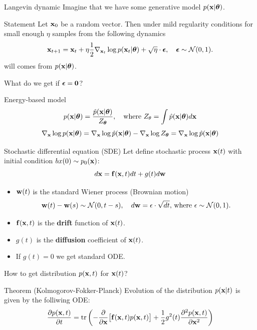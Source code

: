 \begin{frame}{Langevin dynamic}
	Imagine that we have some generative model $p(\mathbf{x} | \boldsymbol{\theta})$.
	\begin{block}{Statement}
		Let $\mathbf{x}_0$ be a random vector. Then under mild regularity conditions for small enough $\eta$ samples from the following dynamics
		\[
			\mathbf{x}_{t + 1} = \mathbf{x}_t + \eta \frac{1}{2} \nabla_{\mathbf{x}_t} \log p(\mathbf{x}_t | \boldsymbol{\theta}) + \sqrt{\eta} \cdot \boldsymbol{\epsilon}, \quad \boldsymbol{\epsilon} \sim \mathcal{N}(0, 1).
		\]
		will comes from $p(\mathbf{x} | \boldsymbol{\theta})$.
	\end{block}
	What do we get if $\boldsymbol{\epsilon} = \boldsymbol{0}$?
	\begin{block}{Energy-based model}
		\[
			p(\mathbf{x} | \boldsymbol{\theta}) = \frac{\hat{p}(\mathbf{x} | \boldsymbol{\theta})}{Z_{\boldsymbol{\theta}}}, \quad \text{where } Z_{\theta} = \int \hat{p}(\mathbf{x} | \boldsymbol{\theta}) d \mathbf{x}
		\]
		\[
			\nabla_{\mathbf{x}} \log p(\mathbf{x} | \boldsymbol{\theta}) = \nabla_{\mathbf{x}} \log \hat{p}(\mathbf{x} | \boldsymbol{\theta}) - \nabla_{\mathbf{x}} \log Z_{\boldsymbol{\theta}} = \nabla_{\mathbf{x}} \log \hat{p}(\mathbf{x} | \boldsymbol{\theta})
		\]
	\end{block}
\end{frame}
\begin{frame}{Stochastic differential equation (SDE)}
	Let define stochastic process $\mathbf{x}(t)$ with initial condition $bx(0) \sim p_0(\mathbf{x})$:
	\[
		d\mathbf{x} = \mathbf{f}(\mathbf{x}, t) dt + g(t) d \mathbf{w}
	\]
	\vspace{-0.6cm}
	\begin{itemize}
		\item $\mathbf{w}(t)$ is the standard Wiener process (Brownian motion)
		\[		
			\mathbf{w}(t) - \mathbf{w}(s) \sim \mathcal{N}(0, t - s), \quad d \mathbf{w} = \epsilon \cdot \sqrt{dt}, \, \text{where } \epsilon \sim \mathcal{N}(0, 1).
		\]
		 \item $\mathbf{f}(\mathbf{x}, t)$ is the \textbf{drift} function of $\mathbf{x}(t)$.
		 \item $g(t)$ is the \textbf{diffusion} coefficient of $\mathbf{x}(t)$.
		 \item If $g(t) = 0$ we get standard ODE.
	\end{itemize}
	 How to get distribution $p(\mathbf{x}, t)$ for $\mathbf{x}(t)$?
 	\begin{block}{Theorem (Kolmogorov-Fokker-Planck)}
 		Evolution of the distribution $p(\mathbf{x} | t)$ is given by the folliwing ODE:
 		\vspace{-0.2cm}
 		\[
 			\frac{\partial p(\mathbf{x}, t)}{\partial t} = \text{tr}\left(- \frac{\partial}{\partial \mathbf{x}} \bigl[ \mathbf{f}(\mathbf{x}, t) p(\mathbf{x}, t)\bigr] + \frac{1}{2} g^2(t) \frac{\partial^2 p(\mathbf{x}, t)}{\partial \mathbf{x}^2} \right)
 		\]
 		\vspace{-0.6cm}
 	\end{block}
\end{frame}
